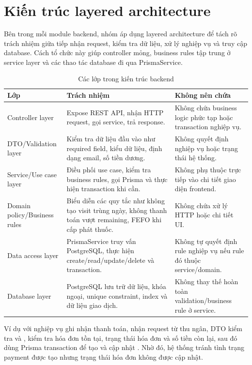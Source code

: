 \section{Kiến trúc layered architecture}

Bên trong mỗi module backend, nhóm áp dụng layered architecture để tách rõ trách nhiệm giữa tiếp nhận request, kiểm tra dữ liệu, xử lý nghiệp vụ và truy cập database. Cách tổ chức này giúp controller mỏng, business rules tập trung ở service layer và các thao tác database đi qua PrismaService.

\begin{longtable}{|p{4cm}|p{7cm}|p{4cm}|}
\caption{Các lớp trong kiến trúc backend}\\
\hline
\textbf{Lớp} & \textbf{Trách nhiệm} & \textbf{Không nên chứa} \\
\hline
Controller layer & Expose REST API, nhận HTTP request, gọi service, trả response. & Không chứa business logic phức tạp hoặc transaction nghiệp vụ. \\
\hline
DTO/Validation layer & Kiểm tra dữ liệu đầu vào như required field, kiểu dữ liệu, định dạng email, số tiền dương. & Không quyết định nghiệp vụ hoặc trạng thái hệ thống. \\
\hline
Service/Use case layer & Điều phối use case, kiểm tra business rules, gọi Prisma và thực hiện transaction khi cần. & Không phụ thuộc trực tiếp vào chi tiết giao diện frontend. \\
\hline
Domain policy/Business rules & Biểu diễn các quy tắc như không tạo visit trùng ngày, không thanh toán vượt remaining, FEFO khi cấp phát thuốc. & Không chứa xử lý HTTP hoặc chi tiết UI. \\
\hline
Data access layer & PrismaService truy vấn PostgreSQL, thực hiện create/read/update/delete và transaction. & Không tự quyết định rule nghiệp vụ nếu rule đó thuộc service/domain. \\
\hline
Database layer & PostgreSQL lưu trữ dữ liệu, khóa ngoại, unique constraint, index và dữ liệu giao dịch. & Không thay thế hoàn toàn validation/business rule ở service. \\
\hline
\end{longtable}

Ví dụ với nghiệp vụ ghi nhận thanh toán,  nhận request từ thu ngân, DTO kiểm tra  và ,  kiểm tra hóa đơn tồn tại, trạng thái hóa đơn và số tiền còn lại, sau đó dùng Prisma transaction để tạo  và cập nhật . Nhờ đó, hệ thống tránh tình trạng payment được tạo nhưng trạng thái hóa đơn không được cập nhật.

